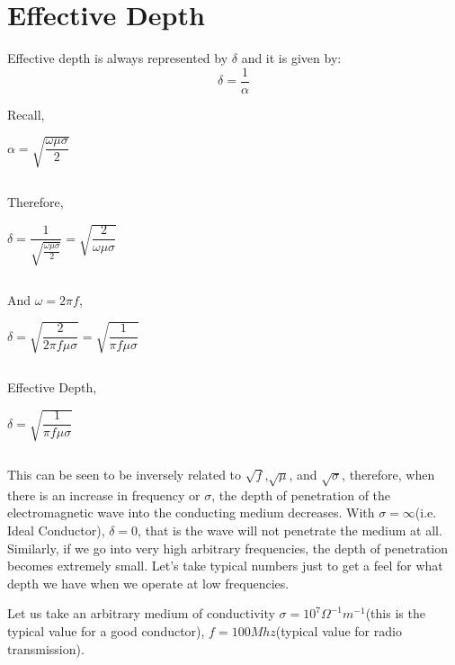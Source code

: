 \section{\textbf{Effective Depth}}

Effective depth is always represented by $\delta$ and it is given by:
\[
\delta=\frac{1}{\alpha}
\]
\begin{equation}\end{equation}

Recall,
\begin{center}
$\alpha=\sqrt{\dfrac{\omega\mu\sigma}{2}}$
\end{center}
\begin{equation}\end{equation}

Therefore,
\begin{center}
$\delta=\dfrac{1}{\sqrt{\frac{\omega\mu\sigma}{2}}}=\sqrt{\dfrac{2}{\omega\mu\sigma}}$
\end{center}
\begin{equation}\end{equation}

And $\omega=2\pi f$,
\begin{center}
$\delta=\sqrt{\dfrac{2}{2\pi f\mu\sigma}}=\sqrt{\dfrac{1}{\pi f \mu\sigma}}$	
\end{center}
\begin{equation}\end{equation}

Effective Depth, 
\begin{center}
$\delta=\sqrt{\dfrac{1}{\pi f \mu\sigma}}$
\end{center}
\begin{equation}\end{equation}

This can be seen to be inversely related to $\sqrt{f}$,$\sqrt{\mu}$, and $\sqrt{{\sigma}}$, therefore, when there is an increase in frequency or $\sigma$, the depth of penetration of the electromagnetic wave into the conducting medium decreases. With $\sigma=\infty$(i.e. Ideal Conductor), $\delta=0$, that is the wave will not penetrate the medium at all. Similarly, if we go into very high arbitrary frequencies, the depth of penetration becomes extremely small. Let's take typical numbers just to get a feel for what depth we have when we operate at low frequencies.

Let us take an arbitrary medium of conductivity $\sigma=10^{7}\Omega^{-1}m^{-1}$(this is the typical value for a good conductor), $f=100Mhz$(typical value for radio transmission).

